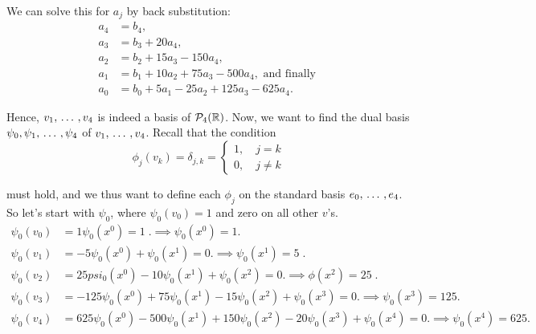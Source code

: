 \begin{xrcs}
\begin{xsol}
    We can solve this for $a_j$ by back substitution:
    \begin{equation}
      \begin{aligned}
      a_4 &= b_4, \\
      a_3 &= b_3 + 20 a_4, \\
      a_2 &= b_2 + 15 a_3 - 150 a_4, \\
      a_1 &= b_1 + 10 a_2 + 75 a_3 - 500 a_4, \text{ and finally } \\
      a_0 &= b_0 + 5a_1 - 25 a_2 + 125 a_3 - 625 a_4.
      \end{aligned}
    \end{equation}

    Hence, $v_1, {\, \ldots \,\,}, v_4$ is indeed a basis of $\mathcal{P}_4(\mathbb{R})$. Now, we want to find the dual basis $\psi_0, \psi_1, {\, \ldots \,\,}, \psi_4$ of $v_1, {\, \ldots \,\,}, v_4$. Recall that the condition
    \begin{equation}
      \phi_j (v_k) = \delta_{j,k} = \begin{cases}
        1,\quad j=k \\ 0, \quad j \neq k
      \end{cases}
    \end{equation}

    must hold, and we thus want to define each $\phi_j$ on the standard basis $e_0, {\, \ldots \,\,}, e_4$. So let's start with $\psi_0$, where $\psi_0 (v_0) = 1$ and zero on all other $v$'s.
    \begin{equation}
      \begin{aligned}
      \psi_0(v_0) &= 1\psi_0(x^0) = 1 \;. \implies \psi_0(x^0) = 1.\\
      \psi_0(v_1) &= -5\psi_0(x^0)+\psi_0(x^1) = 0. \implies \psi_0(x^1) = 5 \;.\\
      \psi_0(v_2) &= 25psi_0(x^0)-10\psi_0(x^1)+\psi_0(x^2)= 0. \implies \phi(x^2) = 25 \;.\\
      \psi_0(v_3) &= -125\psi_0(x^0)+75\psi_0(x^1)-15\psi_0(x^2)+\psi_0(x^3) = 0. \implies \psi_0(x^3) = 125.\\
      \psi_0(v_4) &= 625\psi_0(x^0)-500\psi_0(x^1)+150\psi_0(x^2)-20\psi_0(x^3)+\psi_0(x^4) = 0 . \implies \psi_0(x^4) = 625 .\\
      \end{aligned}
    \end{equation}


\end{xsol}
\end{xrcs}
